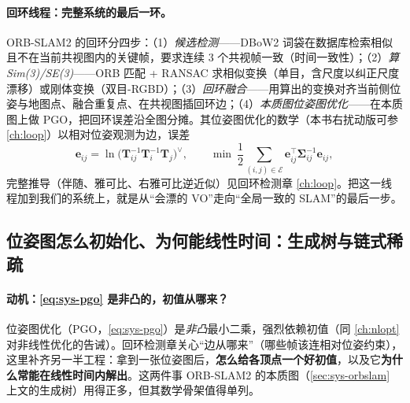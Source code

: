 \paragraph{回环线程：完整系统的最后一环。}
ORB-SLAM2 的回环分四步：（1）\emph{候选检测}——DBoW2 词袋在数据库检索相似且不在当前共视图内的关键帧，要求连续 3 个共视帧一致（时间一致性）；（2）\emph{算 Sim(3)/SE(3)}——ORB 匹配 + RANSAC 求相似变换（单目，含尺度以纠正尺度漂移）或刚体变换（双目-RGBD）；（3）\emph{回环融合}——用算出的变换对齐当前侧位姿与地图点、融合重复点、在共视图插回环边；（4）\emph{本质图位姿图优化}——在本质图上做 PGO，把回环误差沿全图分摊。其位姿图优化的数学（本书右扰动版可参 \cref{ch:loop}）以相对位姿观测为边，误差
\begin{equation}
\mathbf{e}_{ij}=\ln\!\big(\mathbf{T}_{ij}^{-1}\mathbf{T}_i^{-1}\mathbf{T}_j\big)^\vee,\qquad
\min\ \frac12\sum_{(i,j)\in\mathcal{E}}\mathbf{e}_{ij}^\top\boldsymbol\Sigma_{ij}^{-1}\mathbf{e}_{ij},
\label{eq:sys-pgo}
\end{equation}
完整推导（伴随、雅可比、右雅可比逆近似）见回环检测章 \cref{ch:loop}。把这一线程加到我们的系统上，就是从“会漂的 VO”走向“全局一致的 SLAM”的最后一步。

\subsection{位姿图怎么初始化、为何能线性时间：生成树与链式稀疏}
\label{sec:sys-pgo-init}

\paragraph{动机：\cref{eq:sys-pgo} 是非凸的，初值从哪来？}
位姿图优化（PGO，\cref{eq:sys-pgo}）是\emph{非凸}最小二乘，强烈依赖初值（同 \cref{ch:nlopt} 对非线性优化的告诫）。回环检测章关心“边从哪来”（哪些帧该连相对位姿约束），这里补齐另一半工程：拿到一张位姿图后，\textbf{怎么给各顶点一个好初值}，以及它\textbf{为什么常能在线性时间内解出}。这两件事 ORB-SLAM2 的本质图（\cref{sec:sys-orbslam} 上文的生成树）用得正多，但其数学骨架值得单列\cite{barfoot2024state}。

